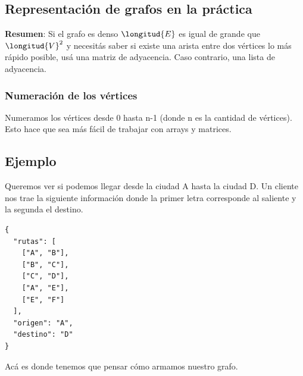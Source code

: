 \documentclass[10pt,a4paper]{article}
\begin{document}
\subsection*{Representación de grafos en la práctica}
\label{subsec:representacion_grafos_practica}
\textbf{Resumen}: Si el grafo es denso $\longitud{E}$ es igual de grande que $\longitud{V}^{2}$ y necesitás saber si existe una arista entre dos vértices lo más rápido posible, usá una matriz de adyacencia. Caso contrario, una lista de adyacencia. 

\subsubsection*{Numeración de los vértices}
Numeramos los vértices desde 0 hasta n-1 (donde n es la cantidad de vértices). Esto hace que sea más fácil de trabajar con arrays y matrices.

\subsection*{Ejemplo}
Queremos ver si podemos llegar desde la ciudad A hasta la ciudad D. Un cliente nos trae la siguiente información donde la primer letra corresponde al saliente y la segunda el destino. \\
\begin{lstlisting}
{
  "rutas": [
    ["A", "B"],
    ["B", "C"],
    ["C", "D"],
    ["A", "E"],
    ["E", "F"]
  ],
  "origen": "A",
  "destino": "D"
}
\end{lstlisting}
Acá es donde tenemos que pensar cómo armamos nuestro grafo. 
\end{document}
